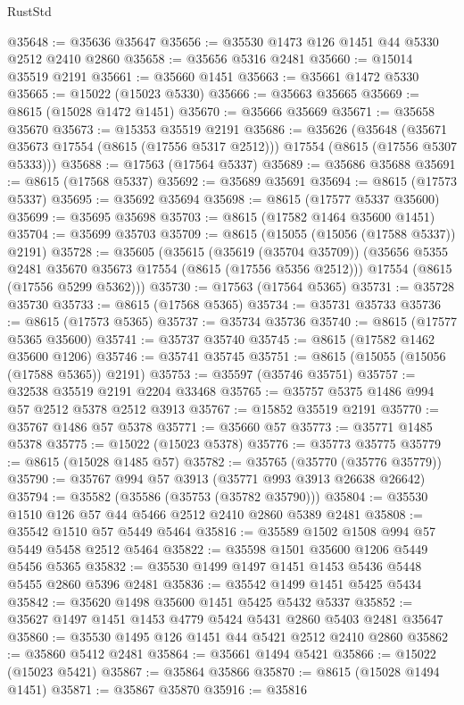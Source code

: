 \begin{lexlean}{RustStd}
\begin{coremodule}
@35648 := @35636 @35647
@35656 := @35530 @1473 @126 @1451 @44 @5330 @2512 @2410 @2860
@35658 := @35656 @5316 @2481
@35660 := @15014 @35519 @2191
@35661 := @35660 @1451
@35663 := @35661 @1472 @5330
@35665 := @15022 (@15023 @5330)
@35666 := @35663 @35665
@35669 := @8615 (@15028 @1472 @1451)
@35670 := @35666 @35669
@35671 := @35658 @35670
@35673 := @15353 @35519 @2191
@35686 := @35626
    (@35648 (@35671 @35673 @17554 (@8615 (@17556 @5317 @2512))) @17554 (@8615 (@17556 @5307 @5333)))
@35688 := @17563 (@17564 @5337)
@35689 := @35686 @35688
@35691 := @8615 (@17568 @5337)
@35692 := @35689 @35691
@35694 := @8615 (@17573 @5337)
@35695 := @35692 @35694
@35698 := @8615 (@17577 @5337 @35600)
@35699 := @35695 @35698
@35703 := @8615 (@17582 @1464 @35600 @1451)
@35704 := @35699 @35703
@35709 := @8615 (@15055 (@15056 (@17588 @5337)) @2191)
@35728 := @35605
    (@35615
      (@35619 (@35704 @35709))
      (@35656 @5355 @2481 @35670 @35673 @17554 (@8615 (@17556 @5356 @2512)))
      @17554
      (@8615 (@17556 @5299 @5362)))
@35730 := @17563 (@17564 @5365)
@35731 := @35728 @35730
@35733 := @8615 (@17568 @5365)
@35734 := @35731 @35733
@35736 := @8615 (@17573 @5365)
@35737 := @35734 @35736
@35740 := @8615 (@17577 @5365 @35600)
@35741 := @35737 @35740
@35745 := @8615 (@17582 @1462 @35600 @1206)
@35746 := @35741 @35745
@35751 := @8615 (@15055 (@15056 (@17588 @5365)) @2191)
@35753 := @35597 (@35746 @35751)
@35757 := @32538 @35519 @2191 @2204 @33468
@35765 := @35757 @5375 @1486 @994 @57 @2512 @5378 @2512 @3913
@35767 := @15852 @35519 @2191
@35770 := @35767 @1486 @57 @5378
@35771 := @35660 @57
@35773 := @35771 @1485 @5378
@35775 := @15022 (@15023 @5378)
@35776 := @35773 @35775
@35779 := @8615 (@15028 @1485 @57)
@35782 := @35765 (@35770 (@35776 @35779))
@35790 := @35767 @994 @57 @3913 (@35771 @993 @3913 @26638 @26642)
@35794 := @35582 (@35586 (@35753 (@35782 @35790)))
@35804 := @35530 @1510 @126 @57 @44 @5466 @2512 @2410 @2860 @5389 @2481
@35808 := @35542 @1510 @57 @5449 @5464
@35816 := @35589 @1502 @1508 @994 @57 @5449 @5458 @2512 @5464
@35822 := @35598 @1501 @35600 @1206 @5449 @5456 @5365
@35832 := @35530 @1499 @1497 @1451 @1453 @5436 @5448 @5455 @2860 @5396 @2481
@35836 := @35542 @1499 @1451 @5425 @5434
@35842 := @35620 @1498 @35600 @1451 @5425 @5432 @5337
@35852 := @35627 @1497 @1451 @1453 @4779 @5424 @5431 @2860 @5403 @2481 @35647
@35860 := @35530 @1495 @126 @1451 @44 @5421 @2512 @2410 @2860
@35862 := @35860 @5412 @2481
@35864 := @35661 @1494 @5421
@35866 := @15022 (@15023 @5421)
@35867 := @35864 @35866
@35870 := @8615 (@15028 @1494 @1451)
@35871 := @35867 @35870
@35916 := @35816

\end{coremodule}
\end{lexlean}
